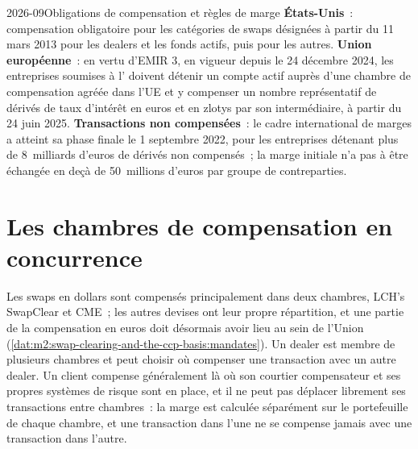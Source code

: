 \begin{dated}{2026-09}{Obligations de compensation et règles de marge}\label{dat:m2:swap-clearing-and-the-ccp-basis:mandates}
\textbf{États-Unis}~: compensation obligatoire pour les catégories de swaps désignées à partir du
11 mars 2013 pour les dealers et les fonds actifs, puis pour les autres. \textbf{Union européenne}~:
en vertu d'EMIR 3, en vigueur depuis le 24 décembre 2024, les entreprises soumises à l' doivent détenir un compte actif auprès d'une chambre de compensation agréée
dans l'UE et y compenser un nombre représentatif de dérivés de taux d'intérêt en euros et en zlotys
par son intermédiaire, à partir du 24 juin 2025. \textbf{Transactions non compensées}~: le
cadre international de marges a atteint sa phase finale le 1 septembre 2022, pour les
entreprises détenant plus de 8~milliards d'euros de dérivés non compensés~; la marge initiale n'a
pas à être échangée en deçà de 50~millions d'euros par groupe de contreparties.
\end{dated}

\section{Les chambres de compensation en concurrence}

Les swaps en dollars sont compensés principalement dans deux chambres, LCH's SwapClear et CME~; les
autres devises ont leur propre répartition, et une partie de la compensation en euros doit désormais
avoir lieu au sein de l'Union (\cref{dat:m2:swap-clearing-and-the-ccp-basis:mandates}). Un dealer est membre de plusieurs chambres et peut choisir où compenser
une transaction avec un autre dealer. Un client compense généralement là où son courtier
compensateur et ses propres systèmes de risque sont en place, et il ne peut pas déplacer librement ses transactions entre
chambres~: la marge est calculée séparément sur le portefeuille de chaque chambre, et une
transaction dans l'une ne se compense jamais avec une transaction dans l'autre.

